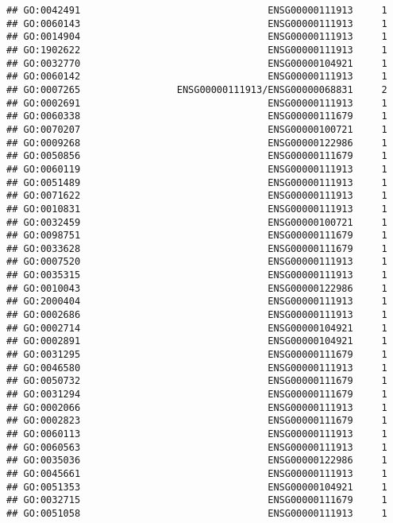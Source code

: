 \documentclass[
]{article}
\begin{document}
\begin{verbatim}
## GO:0042491                                 ENSG00000111913     1
## GO:0060143                                 ENSG00000111913     1
## GO:0014904                                 ENSG00000111913     1
## GO:1902622                                 ENSG00000111913     1
## GO:0032770                                 ENSG00000104921     1
## GO:0060142                                 ENSG00000111913     1
## GO:0007265                 ENSG00000111913/ENSG00000068831     2
## GO:0002691                                 ENSG00000111913     1
## GO:0060338                                 ENSG00000111679     1
## GO:0070207                                 ENSG00000100721     1
## GO:0009268                                 ENSG00000122986     1
## GO:0050856                                 ENSG00000111679     1
## GO:0060119                                 ENSG00000111913     1
## GO:0051489                                 ENSG00000111913     1
## GO:0071622                                 ENSG00000111913     1
## GO:0010831                                 ENSG00000111913     1
## GO:0032459                                 ENSG00000100721     1
## GO:0098751                                 ENSG00000111679     1
## GO:0033628                                 ENSG00000111679     1
## GO:0007520                                 ENSG00000111913     1
## GO:0035315                                 ENSG00000111913     1
## GO:0010043                                 ENSG00000122986     1
## GO:2000404                                 ENSG00000111913     1
## GO:0002686                                 ENSG00000111913     1
## GO:0002714                                 ENSG00000104921     1
## GO:0002891                                 ENSG00000104921     1
## GO:0031295                                 ENSG00000111679     1
## GO:0046580                                 ENSG00000111913     1
## GO:0050732                                 ENSG00000111679     1
## GO:0031294                                 ENSG00000111679     1
## GO:0002066                                 ENSG00000111913     1
## GO:0002823                                 ENSG00000111679     1
## GO:0060113                                 ENSG00000111913     1
## GO:0060563                                 ENSG00000111913     1
## GO:0035036                                 ENSG00000122986     1
## GO:0045661                                 ENSG00000111913     1
## GO:0051353                                 ENSG00000104921     1
## GO:0032715                                 ENSG00000111679     1
## GO:0051058                                 ENSG00000111913     1

\end{verbatim}
\end{document}
